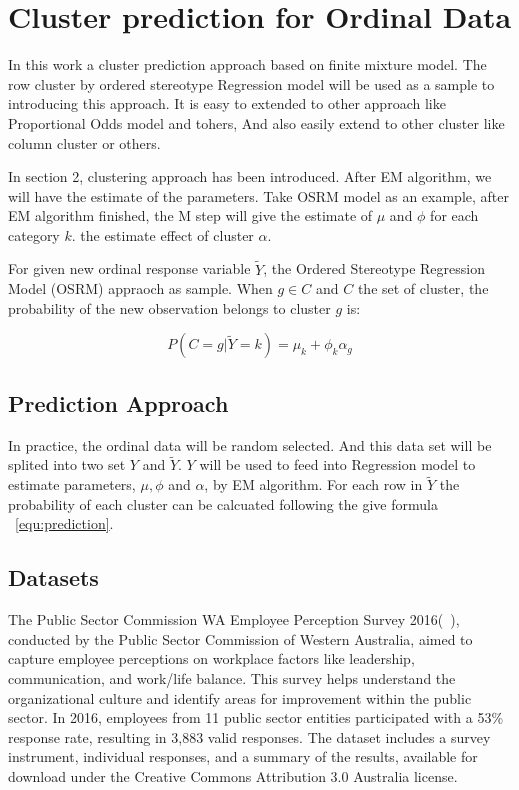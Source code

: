 \documentclass{article}
\begin{document}
\section{Cluster prediction for Ordinal Data}

In this work a cluster prediction approach based on finite mixture model.
The row cluster by ordered stereotype Regression model will be used as a sample to introducing this approach.
It is easy to extended to other approach like Proportional Odds model and tohers, 
And also easily extend to other cluster like column cluster or others.

In section 2, clustering approach has been introduced.
After EM algorithm, we will have the estimate of the parameters.
Take OSRM model as an example, after EM algorithm finished, 
the M step will give the estimate of $\mu$ and $\phi$ for each category $k$.
the estimate effect of cluster  $\alpha$.

For given new ordinal response variable $\tilde{Y}$, the Ordered Stereotype Regression Model (OSRM) appraoch as sample.
When $g \in C$ and $C$ the set of cluster, the probability of the new observation belongs to cluster $g$ is:

\begin{equation}
P(C=g|\tilde{Y}=k) = \mu_k + \phi_k \alpha_g
\label{equ:prediction}
\end{equation}

\subsection{Prediction Approach}

In practice, the ordinal data will be random selected. 
And this data set will be splited into two set $Y$ and $\tilde{Y}$.
$Y$ will be used to feed into Regression model to estimate parameters, $\mu, \phi$ and $\alpha$,  by EM algorithm.
For each row in $\tilde{Y}$ the probability of each cluster can be calcuated following the give formula ~\ref{equ:prediction}.

\subsection{Datasets}

The Public Sector Commission WA Employee Perception Survey 2016(~\cite{PSCWA2016}), conducted by the Public Sector Commission of Western Australia, aimed to capture employee perceptions on workplace factors like leadership, communication, and work/life balance. This survey helps understand the organizational culture and identify areas for improvement within the public sector. In 2016, employees from 11 public sector entities participated with a 53\% response rate, resulting in 3,883 valid responses. The dataset includes a survey instrument, individual responses, and a summary of the results, available for download under the Creative Commons Attribution 3.0 Australia license.
\end{document}
